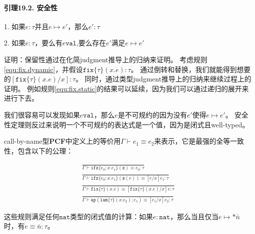 \paragraph{引理19.2. 安全性} \hfil

1. 如果\(e: \tau\)并且\(e \longmapsto e'\)，那么\(e': \tau\)

2. 如果\(e: \tau\)，要么有\(e \mathtt{val}\),要么存在\(e'\)满足\(e \longmapsto e'\)

证明：保留性通过在化简\gls{judgment}推导上的归纳来证明。
考虑规则\ref{equ:fix.dynamic}，并假设\(\mathtt{fix}\{\tau\}(x.e): \tau\)。
通过倒转和替换，我们就能得到想要的\([\mathtt{fix}\{\tau\}(x.e)/x]: \tau\)。
同时，通过类型\gls{judgment}推导上的归纳来继续过程上的证明。
例如规则\ref{equ:fix.static}的结果可以延续，因为我们可以通过递归的展开来进行下去。

我们很容易可以发现如果\(e \mathtt{val}\)，那么\(e\)是不可规约的因为没有\(e'\)使得\(e \longmapsto e'\)。
安全性定理则反过来说明一个不可规约的表达式是一个值，因为是闭式且\gls{well-typed}。

\gls{call-by-name}型\textbf{PCF}中定义上的等价用\(\Gamma \vdash e_1 \equiv e_2\)来表示，它是最强的全等一致性，包含以下的公理：

\begin{gather}
	\frac{}{
		\Gamma \vdash \mathtt{ifz}\{e_0; x.e_1\}(\mathtt{z}) \equiv e_0: \tau
	}
	\tag{19.4a} \\
	\frac{}{
		\Gamma \vdash \mathtt{ifz}\{e_0; x.e_1\}(\mathtt{s}(e)) \equiv [e/x]e_1: \tau
	}
	\tag{19.4b} \\
	\frac{}{
		\Gamma \vdash \mathtt{fix}\{\tau\}(x.e) \equiv [\mathtt{fix}\{\tau\}(x.e)/x]e: \tau
	}
	\tag{19.4c} \\
	\frac{}{
		\Gamma \vdash \mathtt{ap}(\mathtt{lam}\{\tau\}(x.e_2); e_1) \equiv [e_1/x]e_2: \tau
	}
	\tag{19.4d}
\end{gather}

这些规则满足任何\(\mathtt{nat}\)类型的闭式值的计算：如果\(e: \mathtt{nat}\)，那么当且仅当\(e \longmapsto *\bar{n}\)时，有\(e \equiv \bar{n}: \tau\)。